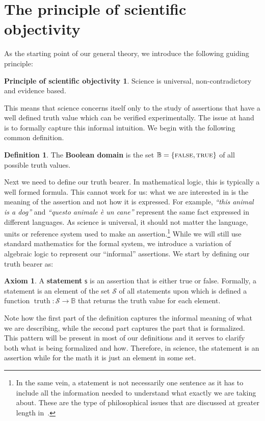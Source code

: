 \documentclass[letterpaper]{article}
\theoremstyle{plain}%
\theoremstyle{definition}
\newtheorem{defn}[thrm]{Definition}
\newtheorem{axiom}[thrm]{Axiom}
\newtheorem*{principle*}{Principle of scientific objectivity}
\theoremstyle{remark}
\numberwithin{equation}{section}
\DeclareMathOperator{\truth}{truth}
\def\TRUE{\textsc{true}}
\def\FALSE{\textsc{false}}
\newcommand{\stmt}[1][s] {\mathsf{#1}}
\newcommand{\statement}[1] {\emph{``#1''}}
\begin{document}
\section{The principle of scientific objectivity}

As the starting point of our general theory, we introduce the following guiding principle:

\begin{principle*}
Science is universal, non-contradictory and evidence based.
\end{principle*}

This means that science concerns itself only to the study of assertions that have a well defined truth value which can be verified experimentally. The issue at hand is to formally capture this informal intuition. We begin with the following common definition.

\begin{defn}
	The \textbf{Boolean domain} is the set $\mathbb{B} = \{\FALSE, \TRUE\}$ of all possible truth values.
\end{defn}

Next we need to define our truth bearer. In mathematical logic, this is typically a well formed formula. This cannot work for us: what we are interested in is the meaning of the assertion and not how it is expressed. For example, \statement{this animal is a dog} and \statement{questo animale \`e un cane} represent the same fact expressed in different languages. As science is universal, it should not matter the language, units or reference system used to make an assertion.\footnote{In the same vein, a statement is not necessarily one sentence as it has to include all the information needed to understand what exactly we are taking about. These are the type of philosophical issues that are discussed at greater length in~\cite{Carc3}.} While we will still use standard mathematics for the formal system, we introduce a variation of algebraic logic to represent our ``informal'' assertions. We start by defining our truth bearer as:

\begin{axiom}\label{ax_statement}
	A \textbf{statement} $\stmt$ is an assertion that is either true or false. Formally, a statement is an element of the set $\mathcal{S}$ of all statements upon which is defined a function $\truth: \mathcal{S} \to \mathbb{B}$ that returns the truth value for each element.
\end{axiom}

Note how the first part of the definition captures the informal meaning of what we are describing, while the second part captures the part that is formalized. This pattern will be present in most of our definitions and it serves to clarify both what is being formalized and how. Therefore, in science, the statement is an assertion while for the math it is just an element in some set.
\end{document}
